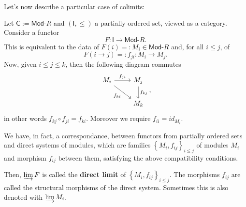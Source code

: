 Let's now describe a particular case of colimits:
\begin{ex}
	Let $\mathsf{C} := \mathsf{Mod}\text{-}R$ and $\left( \mathsf{I}, \leq \right)$ a partially ordered set, viewed as a category.
	Consider a functor
	\begin{equation}
	F: \mathsf{I} \to \mathsf{Mod}\text{-}R
	.\end{equation} 
	This is equivalent to the data of $F(i) =: M_i \in \mathsf{Mod}\text{-}R$ and, for all $i \leq j$, of
	\begin{equation}
		F(i \to j) =: f_{ji}: M_i \to M_j
	.\end{equation} 
	Now, given $i \leq j \leq k$, then the following diagram commutes
	\begin{equation}
	\begin{tikzcd}
		M_i \arrow[r, "f_{ji}", rightarrow] \arrow[rd, "f_{ki}"', rightarrow] &
		M_j \arrow[d, "f_{kj}", rightarrow] \\
		&
		M_k
	\end{tikzcd}
	,\end{equation} 
	in other words $f_{kj} \circ f_{ji} = f_{ki}$. Moreover we require $f_{ii} = id_{M_i}$.

	We have, in fact, a correspondance, between functors from partially ordered sets and
	direct systems of modules, which are families $\left\{ M_i, f_{ij} \right\}_{i \leq j}$ of modules $M_i$ and morphism $f_{ij}$ between them, satisfying the above compatibility conditions.

	Then, $\varinjlim F$ is called the \textbf{direct limit} of $\left\{ M_i, f_{ij} \right\}_{i \leq j}$.
	The morphisms $f_{ij}$ are called the structural morphisms of the direct system.
	Sometimes this is also denoted with $\varinjlim M_i$.
	

\end{ex}

